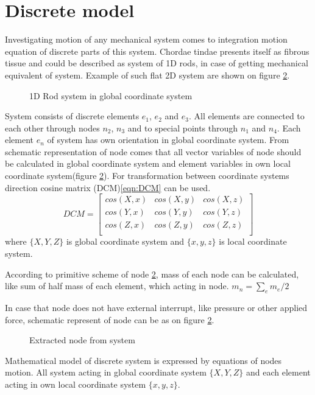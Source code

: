 \section*{Discrete model}
Investigating motion of any mechanical system comes to integration motion
equation of discrete parts of this system. Chordae tindae presents itself as
fibrous tissue and could be described as system of 1D rods, in case of getting
mechanical equivalent of system. Example of such flat 2D system are shown on
figure \ref{fig:nodeExtract}.
\begin{figure}[H]\label{fig:rodSystem}
  \centering
  
  \caption{1D Rod system in global coordinate system}
\end{figure}
System consists of discrete elements $e_1$, $e_2$ and $e_3$. All elements are
connected to each other through nodes $n_2$, $n_3$ and to special points through
$n_1$ and $n_4$. Each element $e_n$ of system has own orientation in global
coordinate system. 
From schematic representation of node comes that all vector variables of node should be calculated
in global coordinate system and element variables in own local coordinate system(figure
\ref{fig:nodeExtract}). For transformation between coordinate systems direction cosine matrix
(DCM)\eqref{eqn:DCM} can be used.
\begin{equation}\label{eqn:DCM}
  DCM= \begin{bmatrix}
    cos(X,x) & cos(X,y) & cos(X,z) \\
    cos(Y,x) & cos(Y,y) & cos(Y,z) \\
    cos(Z,x) & cos(Z,y) & cos(Z,z) \\
  \end{bmatrix}
\end{equation}
where $\{X, Y, Z\}$ is global coordinate system and $\{x,y,z\}$ is local coordinate
system.\par According to primitive scheme of node \ref{fig:nodeExtract}, mass of
each node can be calculated, like sum of half mass of each element, which acting
in node. $m_n=\sum_{e}m_e/2$\par
In case that node does not have external interrupt, like pressure or other
applied force, schematic represent of node can be as on figure
\ref{fig:nodeExtract}.\par
\begin{figure}[H]
  \centering
  
  \caption{Extracted node from system}\label{fig:nodeExtract}
\end{figure}
Mathematical model of discrete system is expressed by equations of nodes motion.
All system acting in global coordinate system $\{X, Y, Z\}$ and each element acting
in own local coordinate system $\{x,y,z\}$.

